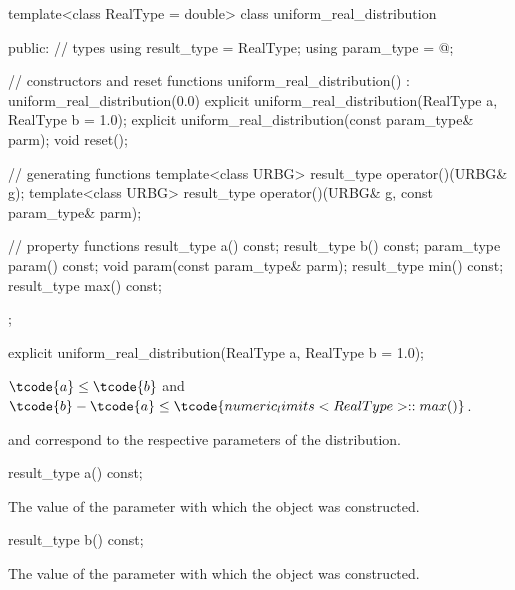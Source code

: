 %
%
\begin{codeblock}
template<class RealType = double>
  class uniform_real_distribution {
  public:
    // types
    using result_type = RealType;
    using param_type  = @\unspec@;

    // constructors and reset functions
    uniform_real_distribution() : uniform_real_distribution(0.0) {}
    explicit uniform_real_distribution(RealType a, RealType b = 1.0);
    explicit uniform_real_distribution(const param_type& parm);
    void reset();

    // generating functions
    template<class URBG>
      result_type operator()(URBG& g);
    template<class URBG>
      result_type operator()(URBG& g, const param_type& parm);

    // property functions
    result_type a() const;
    result_type b() const;
    param_type param() const;
    void param(const param_type& parm);
    result_type min() const;
    result_type max() const;
  };
\end{codeblock}


%
\begin{itemdecl}
explicit uniform_real_distribution(RealType a, RealType b = 1.0);
\end{itemdecl}

\begin{itemdescr}
\pnum
\expects
$\tcode{a} \leq \tcode{b}$
and
$\tcode{b} - \tcode{a} \leq \tcode{numeric_limits<RealType>::max()}$.

\pnum
\remarks
  and 
 correspond to the respective parameters of the distribution.
\end{itemdescr}

%
\begin{itemdecl}
result_type a() const;
\end{itemdecl}

\begin{itemdescr}
\pnum
\returns
The value of the  parameter
 with which the object was constructed.
\end{itemdescr}

%
\begin{itemdecl}
result_type b() const;
\end{itemdecl}

\begin{itemdescr}
\pnum
\returns
The value of the  parameter
 with which the object was constructed.
\end{itemdescr}%
%


